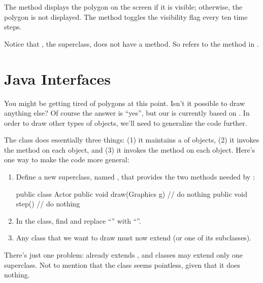 The  method displays the polygon on the screen if it is visible;
otherwise, the polygon is not displayed.
The  method toggles the visibility flag every ten time steps.

Notice that , the superclass, does not have a  method.
So  refers to the  method in .



\section{Java Interfaces}

You might be getting tired of polygons at this point.
Isn't it possible to draw anything else?
Of course the answer is ``yes'', but our  is currently based on .
In order to draw other types of objects, we'll need to generalize the code further.

The  class does essentially three things: (1) it maintains a  of objects, (2) it invokes the  method on each object, and (3) it invokes the  method on each object.
Here's one way to make the code more general:

\begin{enumerate}

\item
Define a new superclass, named , that provides the two methods needed by :

\begin{code}
public class Actor {
    public void draw(Graphics g) {
        // do nothing
    }
    public void step() {
        // do nothing
    }
}
\end{code}

\item
In the  class, find and replace ``'' with ``''.

\item
Any class that we want to draw must now extend  (or one of its subclasses).

\end{enumerate}

There's just one problem:  already extends , and classes may extend only one superclass.
Not to mention that the  class seems pointless, given that it does nothing.

